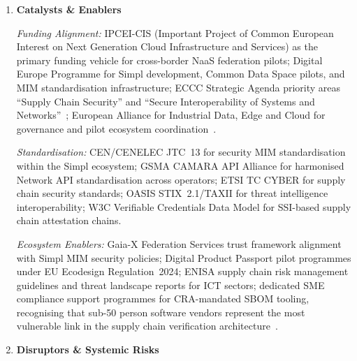 \begin{enumerate}
\item \textbf{Catalysts \& Enablers}

\textit{Funding Alignment:}
IPCEI-CIS (Important Project of Common European Interest on Next Generation Cloud
Infrastructure and Services) as the primary funding vehicle for cross-border NaaS federation
pilots; Digital Europe Programme for Simpl development, Common Data Space pilots, and
MIM standardisation infrastructure; ECCC Strategic Agenda priority areas ``Supply Chain
Security'' and ``Secure Interoperability of Systems and Networks''~\cite{eccc}; European
Alliance for Industrial Data, Edge and Cloud for governance and pilot ecosystem
coordination~\cite{cloud_edge_roadmap}.

\textit{Standardisation:}
CEN/CENELEC JTC~13 for security MIM standardisation within the Simpl ecosystem;
GSMA CAMARA API Alliance for harmonised Network API standardisation across operators;
ETSI TC CYBER for supply chain security standards; OASIS STIX~2.1/TAXII for threat
intelligence interoperability; W3C Verifiable Credentials Data Model for SSI-based
supply chain attestation chains.

\textit{Ecosystem Enablers:}
Gaia-X Federation Services trust framework alignment with Simpl MIM security policies;
Digital Product Passport pilot programmes under EU Ecodesign Regulation~2024;
ENISA supply chain risk management guidelines and threat landscape reports for ICT
sectors; dedicated SME compliance support programmes for CRA-mandated SBOM tooling,
recognising that sub-50 person software vendors represent the most vulnerable link in
the supply chain verification architecture~\cite{cra}.

\item \textbf{Disruptors \& Systemic Risks}


\end{enumerate}
